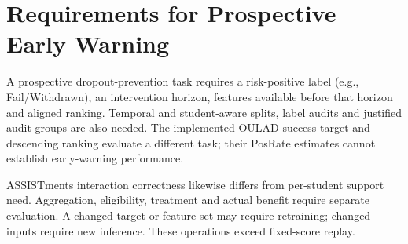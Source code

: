 \section{Requirements for Prospective Early Warning}
\label{app:replication}
A prospective dropout-prevention task requires a risk-positive label (e.g., Fail/Withdrawn), an intervention horizon, features available before that horizon and aligned ranking. Temporal and student-aware splits, label audits and justified audit groups are also needed. The implemented OULAD success target and descending ranking evaluate a different task; their PosRate estimates cannot establish early-warning performance.

ASSISTments interaction correctness likewise differs from per-student support need. Aggregation, eligibility, treatment and actual benefit require separate evaluation. A changed target or feature set may require retraining; changed inputs require new inference. These operations exceed fixed-score replay.
